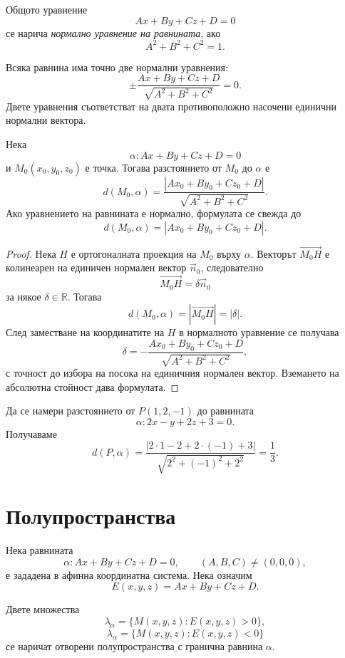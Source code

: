 \begin{keydefn}
Общото уравнение
\[
Ax+By+Cz+D=0
\]
се нарича \emph{нормално уравнение на равнината}, ако
\[
A^2+B^2+C^2=1.
\]
\end{keydefn}

Всяка равнина има точно две нормални уравнения:
\[
\boxed{
\pm\frac{Ax+By+Cz+D}{\sqrt{A^2+B^2+C^2}}=0.}
\]
Двете уравнения съответстват на двата противоположно насочени единични нормални вектора.

\begin{keythm}
Нека
\[
\alpha:Ax+By+Cz+D=0
\]
и $M_0(x_0,y_0,z_0)$ е точка. Тогава разстоянието от $M_0$ до $\alpha$ е
\[
\boxed{
d(M_0,\alpha)=
\frac{|Ax_0+By_0+Cz_0+D|}
{\sqrt{A^2+B^2+C^2}}.}
\]
Ако уравнението на равнината е нормално, формулата се свежда до
\[
d(M_0,\alpha)=|Ax_0+By_0+Cz_0+D|.
\]
\end{keythm}

\begin{proof}
Нека $H$ е ортогоналната проекция на $M_0$ върху $\alpha$. Векторът $\overrightarrow{M_0H}$ е колинеарен на единичен нормален вектор $\vec n_0$, следователно
\[
\overrightarrow{M_0H}=\delta\vec n_0
\]
за някое $\delta\in\mathbb R$. Тогава
\[
d(M_0,\alpha)=|\overrightarrow{M_0H}|=|\delta|.
\]
След заместване на координатите на $H$ в нормалното уравнение се получава
\[
\delta=
-\frac{Ax_0+By_0+Cz_0+D}
{\sqrt{A^2+B^2+C^2}},
\]
с точност до избора на посока на единичния нормален вектор. Вземането на абсолютна стойност дава формулата.
\end{proof}

\begin{example}
Да се намери разстоянието от $P(1,2,-1)$ до равнината
\[
\alpha:2x-y+2z+3=0.
\]
Получаваме
\[
d(P,\alpha)=
\frac{|2\cdot1-2+2\cdot(-1)+3|}
{\sqrt{2^2+(-1)^2+2^2}}
=
\frac{1}{3}.
\]
\end{example}

\section{Полупространства}\label{s:29.5}

Нека равнината
\[
\alpha:Ax+By+Cz+D=0,\qquad (A,B,C)\ne(0,0,0),
\]
е зададена в афинна координатна система. Нека означим
\[
E(x,y,z)=Ax+By+Cz+D.
\]

\begin{defn}
Двете множества
\[
\lambda_\alpha=\{M(x,y,z):E(x,y,z)>0\},
\]
\[
\overline{\lambda}_\alpha=\{M(x,y,z):E(x,y,z)<0\}
\]
се наричат отворени полупространства с гранична равнина $\alpha$.
\end{defn}

